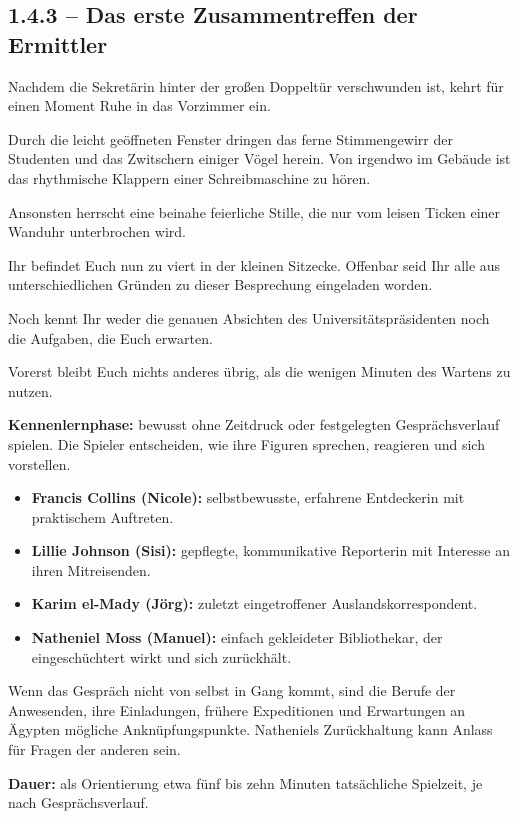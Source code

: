 \subsection{1.4.3 -- Das erste Zusammentreffen der Ermittler}
\begin{vorlesetextalle}
Nachdem die Sekretärin hinter der gro\ss{}en Doppeltür verschwunden ist, kehrt für einen Moment Ruhe in das Vorzimmer ein.

Durch die leicht geöffneten Fenster dringen das ferne Stimmengewirr der Studenten und das Zwitschern einiger Vögel herein. Von irgendwo im Gebäude ist das rhythmische Klappern einer Schreibmaschine zu hören.

Ansonsten herrscht eine beinahe feierliche Stille, die nur vom leisen Ticken einer Wanduhr unterbrochen wird.

Ihr befindet Euch nun zu viert in der kleinen Sitzecke. Offenbar seid Ihr alle aus unterschiedlichen Gründen zu dieser Besprechung eingeladen worden.

Noch kennt Ihr weder die genauen Absichten des Universitätspräsidenten noch die Aufgaben, die Euch erwarten.

Vorerst bleibt Euch nichts anderes übrig, als die wenigen Minuten des Wartens zu nutzen.
\end{vorlesetextalle}

\begin{meisterinfo}
\textbf{Kennenlernphase:} bewusst ohne Zeitdruck oder festgelegten Gesprächsverlauf spielen. Die Spieler entscheiden, wie ihre Figuren sprechen, reagieren und sich vorstellen.

\begin{itemize}
\item \textbf{Francis Collins (Nicole):} selbstbewusste, erfahrene Entdeckerin mit praktischem Auftreten.
\item \textbf{Lillie Johnson (Sisi):} gepflegte, kommunikative Reporterin mit Interesse an ihren Mitreisenden.
\item \textbf{Karim el-Mady (Jörg):} zuletzt eingetroffener Auslandskorrespondent.
\item \textbf{Natheniel Moss (Manuel):} einfach gekleideter Bibliothekar, der eingeschüchtert wirkt und sich zurückhält.
\end{itemize}

Wenn das Gespräch nicht von selbst in Gang kommt, sind die Berufe der Anwesenden, ihre Einladungen, frühere Expeditionen und Erwartungen an Ägypten mögliche Anknüpfungspunkte. Natheniels Zurückhaltung kann Anlass für Fragen der anderen sein.

\textbf{Dauer:} als Orientierung etwa fünf bis zehn Minuten tatsächliche Spielzeit, je nach Gesprächsverlauf.
\end{meisterinfo}


